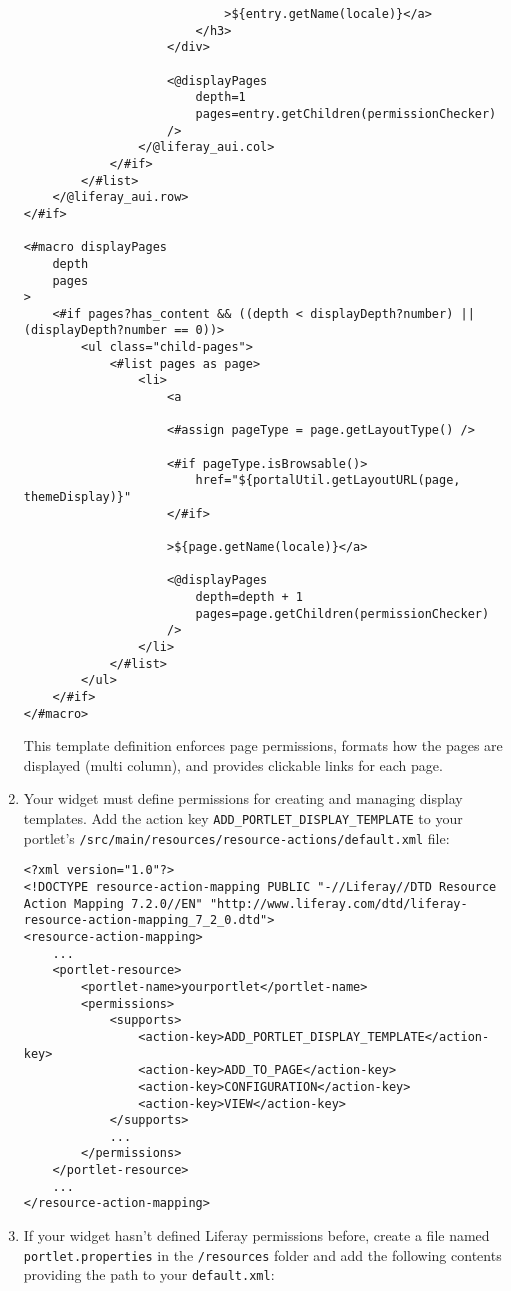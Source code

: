 \begin{enumerate}
\begin{verbatim}
                            >${entry.getName(locale)}</a>
                        </h3>
                    </div>

                    <@displayPages
                        depth=1
                        pages=entry.getChildren(permissionChecker)
                    />
                </@liferay_aui.col>
            </#if>
        </#list>
    </@liferay_aui.row>
</#if>

<#macro displayPages
    depth
    pages
>
    <#if pages?has_content && ((depth < displayDepth?number) || (displayDepth?number == 0))>
        <ul class="child-pages">
            <#list pages as page>
                <li>
                    <a

                    <#assign pageType = page.getLayoutType() />

                    <#if pageType.isBrowsable()>
                        href="${portalUtil.getLayoutURL(page, themeDisplay)}"
                    </#if>

                    >${page.getName(locale)}</a>

                    <@displayPages
                        depth=depth + 1
                        pages=page.getChildren(permissionChecker)
                    />
                </li>
            </#list>
        </ul>
    </#if>
</#macro>
\end{verbatim}

  This template definition enforces page permissions, formats how the
  pages are displayed (multi column), and provides clickable links for
  each page.
\item
  Your widget must define permissions for creating and managing display
  templates. Add the action key \texttt{ADD\_PORTLET\_DISPLAY\_TEMPLATE}
  to your portlet's
  \texttt{/src/main/resources/resource-actions/default.xml} file:

\begin{verbatim}
<?xml version="1.0"?>
<!DOCTYPE resource-action-mapping PUBLIC "-//Liferay//DTD Resource Action Mapping 7.2.0//EN" "http://www.liferay.com/dtd/liferay-resource-action-mapping_7_2_0.dtd">
<resource-action-mapping>
    ...
    <portlet-resource>
        <portlet-name>yourportlet</portlet-name>
        <permissions>
            <supports>
                <action-key>ADD_PORTLET_DISPLAY_TEMPLATE</action-key>
                <action-key>ADD_TO_PAGE</action-key>
                <action-key>CONFIGURATION</action-key>
                <action-key>VIEW</action-key>
            </supports>
            ...
        </permissions>
    </portlet-resource>
    ...
</resource-action-mapping>
\end{verbatim}
\item
  If your widget hasn't defined Liferay permissions before, create a
  file named \texttt{portlet.properties} in the \texttt{/resources}
  folder and add the following contents providing the path to your
  \texttt{default.xml}:


\end{enumerate}
